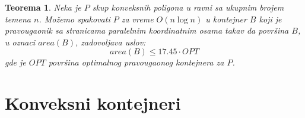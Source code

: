 \documentclass[a4paper]{article}
\theoremstyle{plain}
\newtheorem{thm}{Teorema}[section] %
\theoremstyle{definition}
\begin{document}
\begin{thm}
    Neka je $P$ skup konveksnih poligona u ravni sa ukupnim brojem temena $n$. Mo\v{z}emo spakovati $P$ za vreme $O(n\log{}n)$ u kontejner $B$ koji je pravougaonik sa stranicama paralelnim koordinatnim osama takav da povr\v{s}ina $B$, u oznaci $area(B)$, zadovoljava uslov: $$area(B) \leq 17.45 \cdot OPT$$ gde je $OPT$ povr\v{s}ina optimalnog pravougaonog kontejnera za $P$. 
\end{thm}

\section{Konveksni kontejneri}
\label{sec:Konveksni}


\appendix



\end{document}
